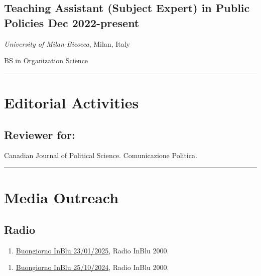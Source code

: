 \documentclass[10pt,]{article}
\providecommand{\tightlist}{%
  \setlength{\itemsep}{0pt}\setlength{\parskip}{0pt}}
\renewenvironment{itemize}{
  \begin{list}{}{
    \setlength{\leftmargin}{1.5em}
  }
}{
  \end{list}
}
\begin{document}
\subsection{\texorpdfstring{Teaching Assistant (Subject Expert) in
Public Policies \hfill Dec
2022-present}{Teaching Assistant (Subject Expert) in Public Policies Dec 2022-present}}\label{teaching-assistant-subject-expert-in-public-policies-dec-2022-present}

\begin{itemize}
\item
  \emph{University of Milan-Bicocca}, Milan, Italy
\item
  BS in Organization Science

  \bigskip \hrule
\end{itemize}

\section{Editorial Activities}\label{editorial-activities}

\subsection{Reviewer for:}\label{reviewer-for}

Canadian Journal of Political Science. Comunicazione Politica.

\bigskip \hrule

\section{Media Outreach}\label{media-outreach}

\subsection{Radio}\label{radio}

\begin{enumerate}
\def\labelenumi{\arabic{enumi}.}
\setcounter{enumi}{1}
\tightlist
\item
  \href{https://www.radioinblu.it/streaming/?vid=0_4i5p4bw4}{Buongiorno
  InBlu 23/01/2025}, Radio InBlu 2000.
\end{enumerate}

\begin{enumerate}
\def\labelenumi{\arabic{enumi}.}
\tightlist
\item
  \href{https://www.radioinblu.it/streaming/?vid=0_onrwcs4r}{Buongiorno
  InBlu 25/10/2024}, Radio InBlu 2000.
\end{enumerate}
\end{document}
